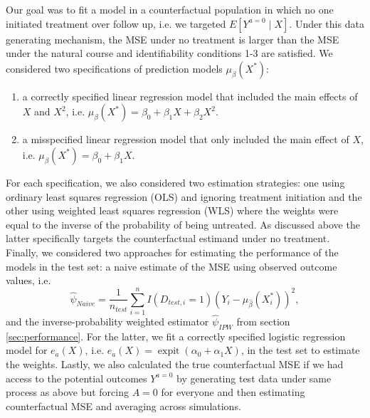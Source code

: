 Our goal was to fit a model in a counterfactual population in which no one initiated treatment over follow up, i.e. we targeted $E[Y^{a=0} \mid X]$. Under this data generating mechanism, the MSE under no treatment is larger than the MSE under the natural course and identifiability conditions 1-3 are satisfied. We considered two specifications of prediction models $\mu_{\beta}(X^*)$:
\begin{enumerate}
    \item a correctly specified linear regression model that included the main effects of $X$ and $X^2$, i.e. $\mu_{\beta}(X^*) = \beta_0 + \beta_1 X + \beta_2 X^2$.
    \item a misspecified linear regression model that only included the main effect of $X$, i.e. $\mu_{\beta}(X^*) = \beta_0 + \beta_1 X$.
\end{enumerate} 
For each specification, we also considered two estimation strategies: one using ordinary least squares regression (OLS) and ignoring treatment initiation and the other using weighted least squares regression (WLS) where the weights were equal to the inverse of the probability of being untreated. As discussed above the latter specifically targets the counterfactual estimand under no treatment. Finally, we considered two approaches for estimating the performance of the models in the test set: a naive estimate of the MSE using observed outcome values, i.e. 
$$\widehat{\psi}_{Naive} = \frac{1}{n_{test}} \sum_{i=1}^n I(D_{test,i} = 1) (Y_i - \mu_{\widehat{\beta}}(X^*_i))^2,$$ 
and the inverse-probability weighted estimator $\widehat{\psi}_{IPW}$ from section \ref{sec:performance}. For the latter, we fit a correctly specified logistic regression model for $e_a(X)$, i.e. $e_a(X) = \operatorname{expit}(\alpha_0 + \alpha_1 X)$, in the test set to estimate the weights. Lastly, we also calculated the true counterfactual MSE if we had access to the potential outcomes $Y^{a=0}$ by generating test data under same process as above but forcing $A = 0$ for everyone and then estimating counterfactual MSE and averaging across simulations.

